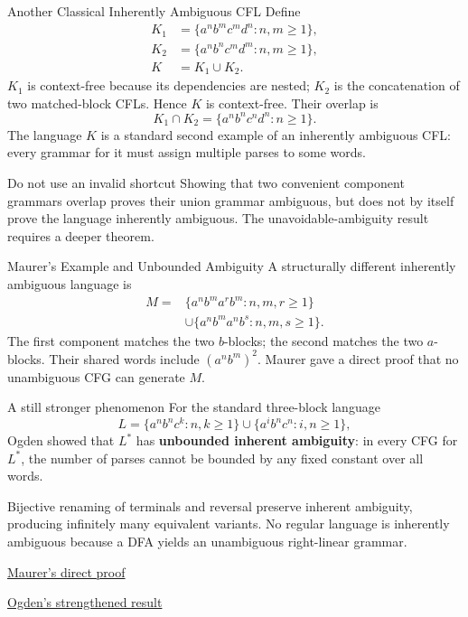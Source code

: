 \documentclass[10pt]{beamer}
\newcommand{\paperlink}[2]{%
  \href{#1}{\textcolor{blue!65!black}{#2}}%
}
\begin{document}
\begin{frame}{Another Classical Inherently Ambiguous CFL}
  \small
  Define
  \[
    \begin{aligned}
      K_1&=\{a^n b^m c^m d^n:n,m\ge1\},\\
      K_2&=\{a^n b^n c^m d^m:n,m\ge1\},\\
      K&=K_1\cup K_2.
    \end{aligned}
  \]
  \pause
  $K_1$ is context-free because its dependencies are nested; $K_2$ is the
  concatenation of two matched-block CFLs. Hence $K$ is context-free.
  Their overlap is
  \[
    K_1\cap K_2=\{a^n b^n c^n d^n:n\ge1\}.
  \]
  The language $K$ is a standard second example of an inherently ambiguous
  CFL: every grammar for it must assign multiple parses to some words.
  \pause
  \begin{alertblock}{Do not use an invalid shortcut}
    Showing that two convenient component grammars overlap proves their union
    grammar ambiguous, but does not by itself prove the language inherently
    ambiguous. The unavoidable-ambiguity result requires a deeper theorem.
  \end{alertblock}
\end{frame}

\begin{frame}{Maurer's Example and Unbounded Ambiguity}
  \footnotesize
  A structurally different inherently ambiguous language is
  \[
    \begin{aligned}
      M={}&\{a^n b^m a^r b^m:n,m,r\ge1\}\\
          &\cup\{a^n b^m a^n b^s:n,m,s\ge1\}.
    \end{aligned}
  \]
  The first component matches the two $b$-blocks; the second matches the two
  $a$-blocks. Their shared words include
  $(a^n b^m)^2$. Maurer gave a direct proof that no unambiguous CFG can
  generate $M$.
  \pause
  \begin{block}{A still stronger phenomenon}
    For the standard three-block language
    \[
      L=\{a^n b^n c^k:n,k\ge1\}
        \cup\{a^i b^n c^n:i,n\ge1\},
    \]
    Ogden showed that $L^*$ has \textbf{unbounded inherent ambiguity}: in
    every CFG for $L^*$, the number of parses cannot be bounded by any fixed
    constant over all words.
  \end{block}
  \pause
  Bijective renaming of terminals and reversal preserve inherent ambiguity,
  producing infinitely many equivalent variants. No regular language is
  inherently ambiguous because a DFA yields an unambiguous right-linear
  grammar.

  \paperlink{https://doi.org/10.1145/321510.321517}{Maurer's direct proof}
  \qquad
  \paperlink{https://doi.org/10.1007/BF01694004}{Ogden's strengthened result}
\end{frame}
\end{document}
